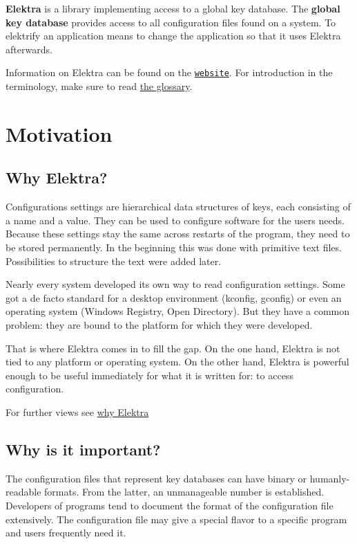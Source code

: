 {\bfseries Elektra} is a library implementing access to a global key database. The {\bfseries global key database} provides access to all configuration files found on a system. To elektrify an application means to change the application so that it uses Elektra afterwards.

Information on Elektra can be found on the \href{https://www.libelektra.org}{\tt website}. For introduction in the terminology, make sure to read \hyperlink{md_doc_help_elektra-glossary_doc_help_elektra-glossary_md}{the glossary}.\hypertarget{md_doc_help_elektra-introduction_doc_help_elektra-introduction_md}{}\section{Motivation}\label{md_doc_help_elektra-introduction_doc_help_elektra-introduction_md}
\subsection*{Why Elektra?}

Configurations settings are hierarchical data structures of keys, each consisting of a name and a value. They can be used to configure software for the user\textquotesingle{}s needs. Because these settings stay the same across restarts of the program, they need to be stored permanently. In the beginning this was done with primitive text files. Possibilities to structure the text were added later.

Nearly every system developed its own way to read configuration settings. Some got a de facto standard for a desktop environment (kconfig, gconfig) or even an operating system (Windows Registry, Open Directory). But they have a common problem\+: they are bound to the platform for which they were developed.

That is where Elektra comes in to fill the gap. On the one hand, Elektra is not tied to any platform or operating system. On the other hand, Elektra is powerful enough to be useful immediately for what it is written for\+: to access configuration.

For further views see \hyperlink{doc_WHY_md}{why Elektra}

\subsection*{Why is it important?}

The configuration files that represent key databases can have binary or humanly-\/readable formats. From the latter, an unmanageable number is established. Developers of programs tend to document the format of the configuration file extensively. The configuration file may give a special flavor to a specific program and users frequently need it.

